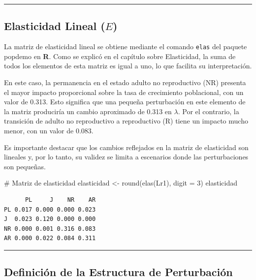 \documentclass[
  12pt,
  letterpaper,
]{book}
\newenvironment{Shaded}{\begin{snugshade}}{\end{snugshade}}
\newcommand{\AttributeTok}[1]{\textcolor[rgb]{0.40,0.45,0.13}{#1}}
\newcommand{\CommentTok}[1]{\textcolor[rgb]{0.37,0.37,0.37}{#1}}
\newcommand{\DecValTok}[1]{\textcolor[rgb]{0.68,0.00,0.00}{#1}}
\newcommand{\FunctionTok}[1]{\textcolor[rgb]{0.28,0.35,0.67}{#1}}
\newcommand{\NormalTok}[1]{\textcolor[rgb]{0.00,0.23,0.31}{#1}}
\newcommand{\OtherTok}[1]{\textcolor[rgb]{0.00,0.23,0.31}{#1}}
\begin{document}
\begin{center}\rule{0.5\linewidth}{0.5pt}\end{center}

\subsection{\texorpdfstring{Elasticidad Lineal
(\(E\))}{Elasticidad Lineal (E)}}\label{elasticidad-lineal-e}

La matriz de elasticidad lineal se obtiene mediante el comando
\texttt{elas} del paquete popdemo en \textbf{R}. Como se explicó en el
capítulo sobre Elasticidad, la suma de todos los elementos de esta
matriz es igual a uno, lo que facilita su interpretación.

En este caso, la permanencia en el estado adulto no reproductivo (NR)
presenta el mayor impacto proporcional sobre la tasa de crecimiento
poblacional, con un valor de 0.313. Esto significa que una pequeña
perturbación en este elemento de la matriz produciría un cambio
aproximado de 0.313 en \(\lambda\). Por el contrario, la transición de
adulto no reproductivo a reproductivo (R) tiene un impacto mucho menor,
con un valor de 0.083.

Es importante destacar que los cambios reflejados en la matriz de
elasticidad son lineales y, por lo tanto, su validez se limita a
escenarios donde las perturbaciones son pequeñas.

\begin{Shaded}
\begin{Highlighting}[]
 \CommentTok{\# Matriz de elasticidad}
\NormalTok{elasticidad }\OtherTok{\textless{}{-}} \FunctionTok{round}\NormalTok{(}\FunctionTok{elas}\NormalTok{(Lr1), }\AttributeTok{digit =} \DecValTok{3}\NormalTok{)}
\NormalTok{elasticidad}
\end{Highlighting}
\end{Shaded}

\begin{verbatim}
      PL     J    NR    AR
PL 0.017 0.000 0.000 0.023
J  0.023 0.120 0.000 0.000
NR 0.000 0.001 0.316 0.083
AR 0.000 0.022 0.084 0.311
\end{verbatim}

\begin{center}\rule{0.5\linewidth}{0.5pt}\end{center}

\subsection{Definición de la Estructura de
Perturbación}\label{definiciuxf3n-de-la-estructura-de-perturbaciuxf3n}
\end{document}
